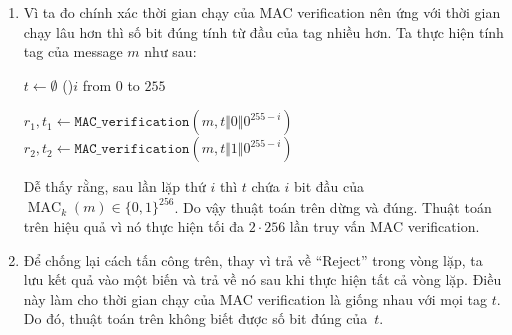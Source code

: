 \begin{loigiai}
\begin{enumerate}[label=(\alph*)]
\item Vì ta đo chính xác thời gian chạy của MAC verification nên ứng với thời gian chạy lâu hơn thì số bit đúng tính từ
đầu của tag nhiều hơn. Ta thực hiện tính tag của message $m$ như sau:

\begin{minipage}{\linewidth}
\begin{algorithm}[H]
\caption{Tấn công với MAC verification oracle}
\BlankLine
$t \gets \emptyset$
\BlankLine
\For(){$i$ from $0$ to $255$}{
  $r_1, t_1 \gets \texttt{MAC\_verification}(m, t\Vert 0\Vert 0^{255 - i})$
  \BlankLine
  $r_2, t_2 \gets \texttt{MAC\_verification}(m, t\Vert 1\Vert 0^{255 - i})$\;
  \BlankLine

}
\end{algorithm}
\end{minipage}

Dễ thấy rằng, sau lần lặp thứ $i$ thì $t$ chứa $i$ bit đầu của $\mathop{MAC}_k(m) \in \{0, 1\}^{256}$. Do vậy thuật toán
trên dừng và đúng. Thuật toán trên hiệu quả vì nó thực hiện tối đa $2\cdot 256$ lần truy vấn MAC verification.

\item Để chống lại cách tấn công trên, thay vì trả về ``Reject'' trong vòng lặp, ta lưu kết quả vào một biến và trả
về nó sau khi thực hiện tất cả vòng lặp. Điều này làm cho thời gian chạy của MAC verification là giống nhau với mọi
tag $t$. Do đó, thuật toán trên không biết được số bit đúng của~$t$.
\end{enumerate}
\end{loigiai}

